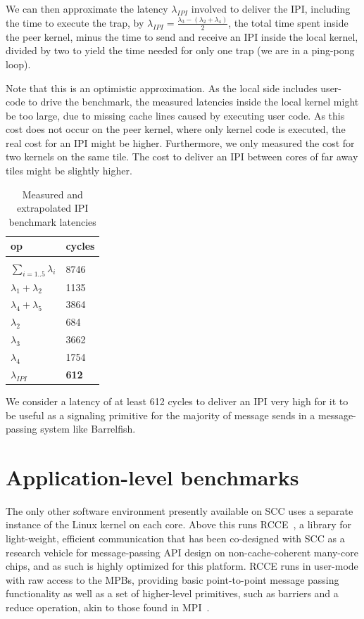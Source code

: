 \documentclass[a4paper,twoside]{report} %
\begin{document}
We can then approximate the latency $\lambda_{IPI}$ involved to
deliver the IPI, including the time to execute the trap, by
$\lambda_{IPI} = \frac{\lambda_3 - (\lambda_2 + \lambda_4)}{2}$, the
total time spent inside the peer kernel, minus the time to send and
receive an IPI inside the local kernel, divided by two to yield the
time needed for only one trap (we are in a ping-pong loop).

Note that this is an optimistic approximation. As the local side
includes user-code to drive the benchmark, the measured latencies
inside the local kernel might be too large, due to missing cache lines
caused by executing user code. As this cost does not occur on the peer
kernel, where only kernel code is executed, the real cost for an IPI
might be higher. Furthermore, we only measured the cost for two
kernels on the same tile. The cost to deliver an IPI between cores of
far away tiles might be slightly higher.

\begin{table}
  \centering
  \begin{tabular}{p{}|p{}}
    op & cycles \\
    \hline \\
    $\sum_{i=1..5}{\lambda_i}$ & 8746 \\
    $\lambda_1 + \lambda_2$ & 1135 \\
    $\lambda_4 + \lambda_5$ & 3864 \\
    $\lambda_2$ & 684 \\
    $\lambda_3$ & 3662 \\
    $\lambda_4$ & 1754 \\
    $\lambda_{IPI}$ & \textbf{612} \\
  \end{tabular}
  \caption{Measured and extrapolated IPI benchmark latencies}
  \label{tab:ipiresults}
\end{table}

We consider a latency of at least 612 cycles to deliver an IPI very
high for it to be useful as a signaling primitive for the majority of
message sends in a message-passing system like Barrelfish.

\section{Application-level benchmarks}

The only other software environment presently available on SCC uses a
separate instance of the Linux kernel on each core. Above this runs
RCCE~\cite{intel:rcce}, a library for light-weight, efficient
communication that has been co-designed with SCC as a research vehicle
for message-passing API design on non-cache-coherent many-core chips,
and as such is highly optimized for this platform. RCCE runs in
user-mode with raw access to the MPBs, providing basic point-to-point
message passing functionality as well as a set of higher-level
primitives, such as barriers and a reduce operation, akin to those
found in MPI~\cite{mpi}.
\end{document}
